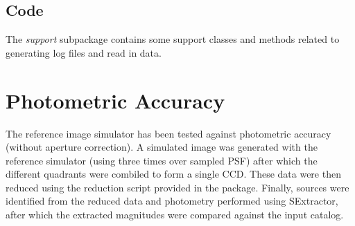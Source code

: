 \documentclass[a4paper,12pt,english]{sphinxmanual}
\begin{document}
\section{Code}
\label{index:code}
The \emph{support} subpackage contains some support classes and methods related to generating log files and read in
data.


\chapter{Photometric Accuracy}
\label{index:photometric-accuracy}
The reference image simulator has been tested against photometric accuracy (without aperture correction). A
simulated image was generated with the reference simulator (using three times over sampled PSF) after
which the different quadrants were combiled to form a single CCD. These data were then reduced using the
reduction script provided in the package. Finally, sources were identified from the reduced data and photometry performed
using SExtractor, after which the extracted magnitudes were compared against the input catalog.
\end{document}
